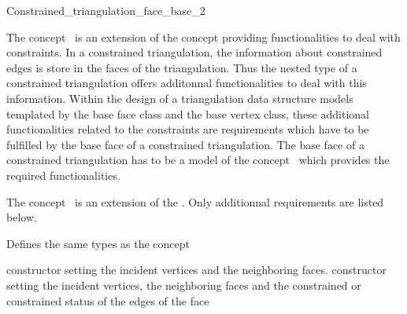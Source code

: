 

\begin{ccRefConcept}{Constrained_triangulation_face_base_2}


\ccDefinition
The concept \ccRefName\ is  an extension of the
 concept
providing functionalities to deal with
constraints.  
In a constrained triangulation,
the information about constrained edges is store in the 
faces of the triangulation.
Thus the nested 
type of a constrained triangulation offers
additonnal functionalities to deal with this information.
Within the design of a triangulation data structure
models templated by the base face class and the base vertex class,
these additional functionalities related to the constraints
are requirements which have to be fulfilled
by the base face of  a constrained triangulation.
The base face of a constrained triangulation
has to be a model of the concept
\ccRefName\ which provides the
required functionalities.

The concept \ccRefName\ is  an extension of the
. Only additionnal
requirements are listed below.

\ccTypes
Defines the same types as the  concept


\ccCreation
{}  %

\ccGlue
{}
\ccGlue
{} 
{constructor setting the incident vertices and the neighboring faces.}
\ccGlue
{}
 {constructor setting the incident vertices, the neighboring faces and 
the constrained or constrained status of the edges of the face}
                   


\end{ccRefConcept}

